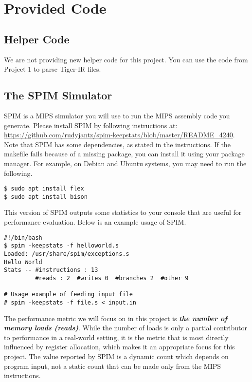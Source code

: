 \documentclass[12pt]{article}
\begin{document}

\section{Provided Code}

\subsection{Helper Code}

We are not providing new helper code for this project.
You can use the code from Project 1 to parse Tiger-IR files.

\subsection{The SPIM Simulator}

SPIM is a MIPS simulator you will use to run the MIPS assembly code you generate.
Please install SPIM by following instructions at: \url{https://github.com/rudyjantz/spim-keepstats/blob/master/README_4240}. Note that SPIM has some dependencies, as stated in the instructions. If the makefile fails because of a missing package, you can install it using your package manager. For example, on Debian and Ubuntu systems, you may need to run the following.
\begin{lstlisting}[]
$ sudo apt install flex
$ sudo apt install bison
\end{lstlisting}

This version of SPIM outputs some statistics to your console that are useful for performance evaluation. Below is an example usage of SPIM.

\begin{lstlisting}[]
#!/bin/bash
$ spim -keepstats -f helloworld.s
Loaded: /usr/share/spim/exceptions.s
Hello World
Stats -- #instructions : 13
         #reads : 2  #writes 0  #branches 2  #other 9

# Usage example of feeding input file
# spim -keepstats -f file.s < input.in
\end{lstlisting}

The performance metric we will focus on in this project is \textit{\textbf{the number of memory loads (reads)}}.  While the number of loads is only a partial contributor to performance in a real-world setting, it is the metric that is most directly influenced by register allocation, which makes it an appropriate focus for this project. The value reported by SPIM is a dynamic count which depends on program input, not a static count that can be made only from the MIPS instructions.
\end{document}
